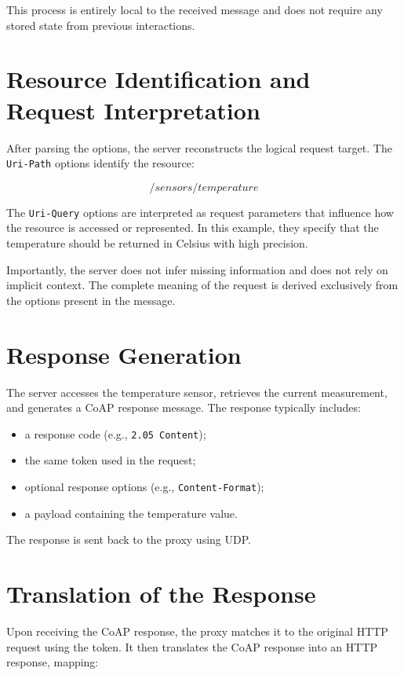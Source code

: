 \documentclass{scrbook}
\begin{document}
This process is entirely local to the received message and does not require any stored state from previous interactions.

\section{Resource Identification and Request Interpretation}

After parsing the options, the server reconstructs the logical request target. The \texttt{Uri-Path} options identify the resource:

\[
/sensors/temperature
\]

The \texttt{Uri-Query} options are interpreted as request parameters that influence how the resource is accessed or represented. In this example, they specify that the temperature should be returned in Celsius with high precision.

Importantly, the server does not infer missing information and does not rely on implicit context. The complete meaning of the request is derived exclusively from the options present in the message.

\section{Response Generation}

The server accesses the temperature sensor, retrieves the current measurement, and generates a CoAP response message. The response typically includes:

\begin{itemize}
    \item a response code (e.g., \texttt{2.05 Content});
    \item the same token used in the request;
    \item optional response options (e.g., \texttt{Content-Format});
    \item a payload containing the temperature value.
\end{itemize}

The response is sent back to the proxy using UDP.

\section{Translation of the Response}

Upon receiving the CoAP response, the proxy matches it to the original HTTP request using the token. It then translates the CoAP response into an HTTP response, mapping:
\end{document}
